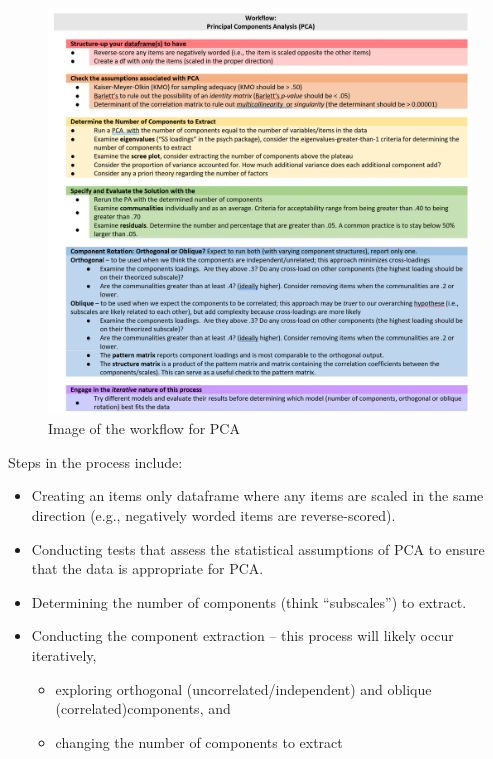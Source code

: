 \documentclass[
  english,
]{book}
\providecommand{\tightlist}{%
  \setlength{\itemsep}{0pt}\setlength{\parskip}{0pt}}
\begin{document}
\begin{figure}
\centering
\includegraphics{images/PCA/PCAworkflow.png}
\caption{Image of the workflow for PCA}
\end{figure}

Steps in the process include:

\begin{itemize}
\tightlist
\item
  Creating an items only dataframe where any items are scaled in the same direction (e.g., negatively worded items are reverse-scored).
\item
  Conducting tests that assess the statistical assumptions of PCA to ensure that the data is appropriate for PCA.
\item
  Determining the number of components (think ``subscales'') to extract.
\item
  Conducting the component extraction -- this process will likely occur iteratively,

  \begin{itemize}
  \tightlist
  \item
    exploring orthogonal (uncorrelated/independent) and oblique (correlated)components, and
  \item
    changing the number of components to extract
  \end{itemize}
\end{itemize}
\end{document}
